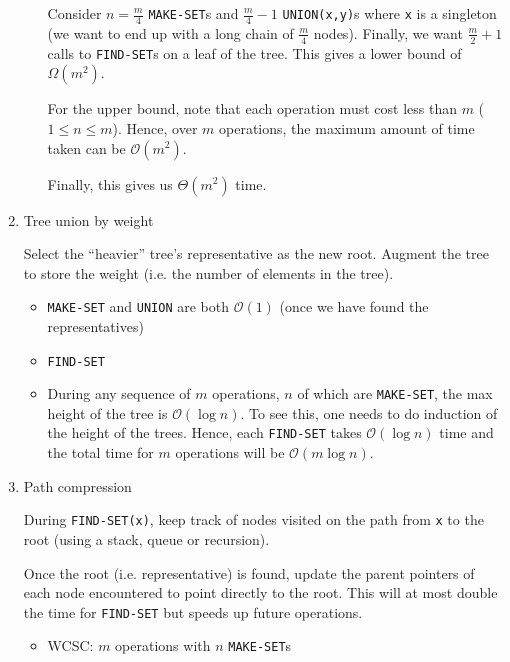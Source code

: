 \documentclass[11pt]{article}
\begin{document}
\begin{enumerate}
\begin{itemize}
        Consider $n = \frac{m}{4}$ \texttt{MAKE-SET}s and $\frac{m}{4} - 1$ \texttt{UNION(x,y)}s where \texttt{x} is a singleton (we want to end up with a long chain of $\frac{m}{4}$ nodes). Finally, we want $\frac{m}{2}+1$ calls to \texttt{FIND-SET}s on a leaf of the tree. This gives a lower bound of $\Omega(m^2)$. 
        
        For the upper bound, note that each operation must cost less than $m$ ($ 1 \leq n \leq m$). Hence, over $m$ operations, the maximum amount of time taken can be $\mathcal{O}(m^2)$. 
        
        Finally, this gives us $\Theta(m^2)$ time. 
        
    \end{itemize}
    
        \item Tree union by weight 
        
        Select the ``heavier'' tree's representative as the new root. Augment the tree to store the weight (i.e. the number of elements in the tree). 
        \begin{itemize}
            \item \texttt{MAKE-SET} and \texttt{UNION} are both $\mathcal{O}(1)$ (once we have found the representatives)
            
            \item \texttt{FIND-SET}
            
            \item During any sequence of $m$ operations, $n$ of which are \texttt{MAKE-SET}, the max height of the tree is $\mathcal{O}(\log n)$. To see this, one needs to do induction of the height of the trees. Hence, each \texttt{FIND-SET} takes $\mathcal{O}(\log n)$ time and the total time for $m$ operations will be $\mathcal{O}(m \log n )$. 
        \end{itemize}
    
    \item Path compression 
    
    During \texttt{FIND-SET(x)}, keep track of nodes visited on the path from \texttt{x} to the root (using a stack, queue or recursion). 
    
    Once the root (i.e. representative) is found, update the parent pointers of each node encountered to point directly to the root. This will at most double the time for \texttt{FIND-SET} but speeds up future operations. 
    
    \begin{itemize}
        \item WCSC: $m$ operations with $n$ \texttt{MAKE-SET}s 
        

\end{itemize}
\end{enumerate}
\end{document}
